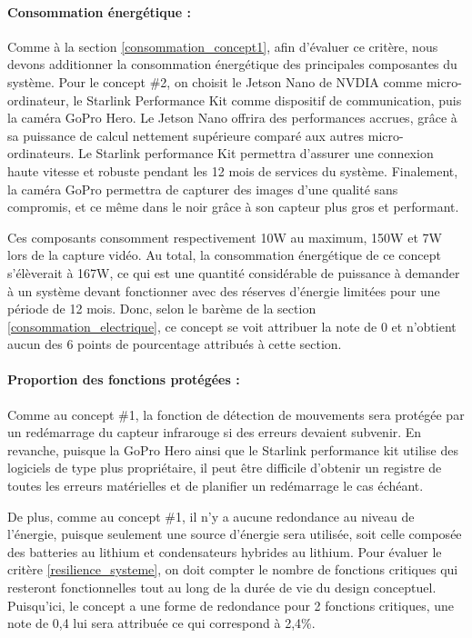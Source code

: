 \paragraph{Consommation énergétique :}
Comme à la section \ref{consommation_concept1}, afin d'évaluer ce critère, nous devons additionner la consommation énergétique des principales composantes du système. 
Pour le concept \#2, on choisit le Jetson Nano de NVDIA comme micro-ordinateur, le Starlink Performance Kit comme dispositif de communication, puis la caméra GoPro Hero. 
Le Jetson Nano offrira des performances accrues, grâce à sa puissance de calcul nettement supérieure comparé aux autres micro-ordinateurs. Le Starlink performance Kit 
permettra d'assurer une connexion haute vitesse et robuste pendant les 12 mois de services du système. Finalement, la caméra GoPro permettra de capturer des images 
d'une qualité sans compromis, et ce même dans le noir grâce à son capteur plus gros et performant.

\bigskip
Ces composants consomment respectivement 10W au maximum, 150W et 7W lors de la capture vidéo. Au total, la consommation énergétique de ce concept s'élèverait à 167W, 
ce qui est une quantité considérable de puissance à demander à un système devant fonctionner avec des réserves d'énergie limitées pour une période de 12 mois.
Donc, selon le barème de la section \ref{consommation_electrique}, ce concept se voit attribuer la note de 0 et n'obtient aucun des 6 points de pourcentage attribués à 
cette section.


\paragraph{Proportion des fonctions protégées :}
Comme au concept \#1, la fonction de détection de mouvements sera protégée par un redémarrage du capteur infrarouge si des erreurs devaient subvenir.
En revanche, puisque la GoPro Hero ainsi que le Starlink performance kit utilise des logiciels de type plus propriétaire, il peut être difficile 
d'obtenir un registre de toutes les erreurs matérielles et de planifier un redémarrage le cas échéant.

\bigskip
De plus, comme au concept \#1, il n'y a aucune redondance au niveau de l'énergie, puisque seulement une source d'énergie sera utilisée, soit celle 
composée des batteries au lithium et condensateurs hybrides au lithium.
Pour évaluer le critère \ref{resilience_systeme}, on doit compter le nombre de fonctions critiques qui resteront fonctionnelles tout au long de la durée de vie du design conceptuel.
Puisqu'ici, le concept a une forme de redondance pour 2 fonctions critiques, une note de 0,4 lui sera attribuée ce qui correspond à 2,4\%.



